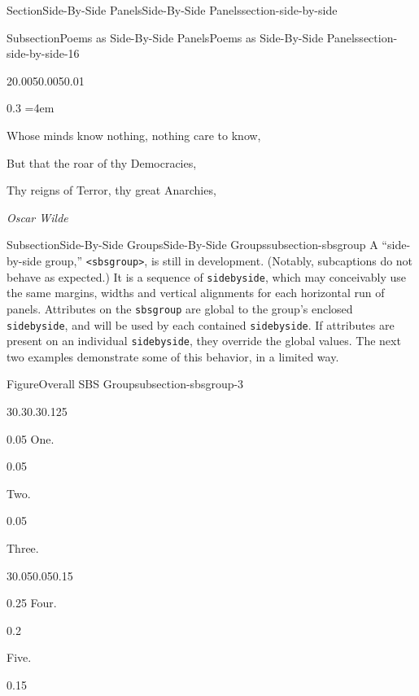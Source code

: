 \documentclass[twoside,10pt,]{article}
\newcommand{\mono}[1]{\texttt{#1}}
\numberwithin{equation}{section}
\newenvironment{poem}{\setlength{\parindent}{0em}}{}
\newenvironment{stanza}{\vspace{0.25 em}\hangindent=4em}{\vspace{1 em}}
\newcommand{\poemauthorleft}[1]{\vspace{-1em}\begin{flushleft}\textit{#1}\end{flushleft}}
\newcommand{\poemlineleft}[1]{{\raggedright{#1}\par}\vspace{-\parskip}}
\begin{document}
\begin{sectionptx}{Section}{Side-By-Side Panels}{}{Side-By-Side Panels}{}{}{section-side-by-side}
\begin{subsectionptx}{Subsection}{Poems as Side-By-Side Panels}{}{Poems as Side-By-Side Panels}{}{}{section-side-by-side-16}
\begin{sidebyside}{2}{0.005}{0.005}{0.01}
\begin{sbspanel}{0.3}
\begin{poem}
\begin{stanza}
\poemlineleft{Whose minds know nothing, nothing care to know,}
\poemlineleft{But that the roar of thy Democracies,}
\poemlineleft{Thy reigns of Terror, thy great Anarchies,}
\poemlineleft{\textellipsis{}}
\end{stanza}
\poemauthorleft{Oscar Wilde}
\end{poem}
\end{sbspanel}%
\end{sidebyside}%
\end{subsectionptx}
%
%
\typeout{************************************************}
\typeout{************************************************}
%
\begin{subsectionptx}{Subsection}{Side-By-Side Groups}{}{Side-By-Side Groups}{}{}{subsection-sbsgroup}
A ``side-by-side group,'' \mono{<sbsgroup>}, is still in development.  (Notably, subcaptions do not behave as expected.)  It is a sequence of \mono{sidebyside}, which may conceivably use the same margins, widths and vertical alignments for each horizontal run of panels.  Attributes on the \mono{sbsgroup} are global to the group's enclosed \mono{sidebyside}, and will be used by each contained \mono{sidebyside}.  If attributes are present on an individual \mono{sidebyside}, they override the global values.  The next two examples demonstrate some of this behavior, in a limited way.%
\begin{figureptx}{Figure}{Overall SBS Group}{subsection-sbsgroup-3}{}%
\centering
\begin{sidebyside}{3}{0.3}{0.3}{0.125}%
\begin{sbspanel}{0.05}%
One.%
\end{sbspanel}%
\begin{sbspanel}{0.05}%
\par
Two.%
\end{sbspanel}%
\begin{sbspanel}{0.05}%
\par
Three.%
\end{sbspanel}%
\end{sidebyside}%
\begin{sidebyside}{3}{0.05}{0.05}{0.15}%
\begin{sbspanel}{0.25}%
Four.%
\end{sbspanel}%
\begin{sbspanel}{0.2}%
\par
Five.%
\end{sbspanel}%
\begin{sbspanel}{0.15}%
\par

\end{sbspanel}
\end{sidebyside}
\end{figureptx}
\end{subsectionptx}
\end{sectionptx}
\end{document}
